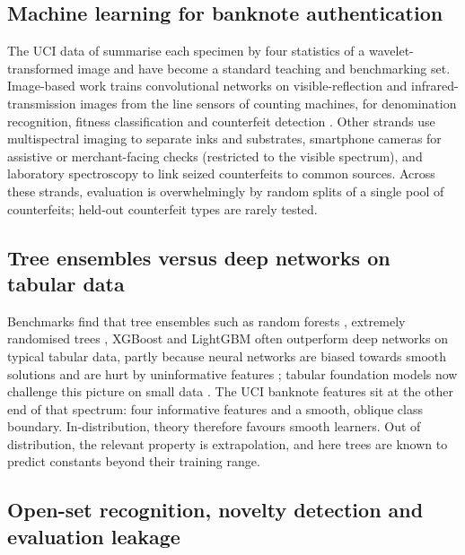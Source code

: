 \documentclass{article}
\theoremstyle{definition}
\theoremstyle{remark}
\begin{document}
\subsection{Machine learning for banknote authentication}

The UCI data of \citet{lohweg2013banknote} summarise each specimen by four statistics of a wavelet-transformed image and have become a standard teaching and benchmarking set. Image-based work trains convolutional networks on visible-reflection and infrared-transmission images from the line sensors of counting machines, for denomination recognition, fitness classification and counterfeit detection \citep{lee2017survey,pham2020fake}. Other strands use multispectral imaging to separate inks and substrates, smartphone cameras for assistive or merchant-facing checks (restricted to the visible spectrum), and laboratory spectroscopy to link seized counterfeits to common sources. Across these strands, evaluation is overwhelmingly by random splits of a single pool of counterfeits; held-out counterfeit types are rarely tested.

\subsection{Tree ensembles versus deep networks on tabular data}

Benchmarks find that tree ensembles such as random forests \citep{breiman2001random}, extremely randomised trees \citep{geurts2006extremely}, XGBoost \citep{chen2016xgboost} and LightGBM \citep{ke2017lightgbm} often outperform deep networks on typical tabular data, partly because neural networks are biased towards smooth solutions and are hurt by uninformative features \citep{grinsztajn2022tree,shwartzziv2022tabular}; tabular foundation models now challenge this picture on small data \citep{hollmann2025tabpfn}. The UCI banknote features sit at the other end of that spectrum: four informative features and a smooth, oblique class boundary. In-distribution, theory therefore favours smooth learners. Out of distribution, the relevant property is extrapolation, and here trees are known to predict constants beyond their training range.

\subsection{Open-set recognition, novelty detection and evaluation leakage}
\end{document}
